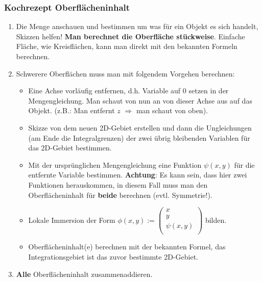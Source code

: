 \documentclass[a4paper, fontsize = 8pt, landscape]{scrartcl}
\begin{document}
\begin{multicols*}{3}
\begin{small}
        \subsubsection{Kochrezept Oberflächeninhalt}

        \begin{enumerate}
            \item Die Menge anschauen und bestimmen um was für ein Objekt es sich handelt, Skizzen helfen! \textbf{Man berechnet die Oberfläche stückweise}. Einfache Fläche, wie Kreisflächen, kann man direkt mit den bekannten Formeln berechnen.
            \item Schwerere Oberflächen muss man mit folgendem Vorgehen berechnen:
                  \begin{itemize}
                      \item Eine Achse vorläufig entfernen, d.h. Variable auf $0$ setzen in der Mengengleichung. Man schaut von nun an von dieser Achse aus auf das Objekt. (z.B.: Man entfernt $z$ $\Rightarrow$ man schaut von oben).
                      \item Skizze von dem neuen 2D-Gebiet erstellen und dann die Ungleichungen (am Ende die Integralgrenzen) der zwei übrig bleibenden Variablen für das 2D-Gebiet bestimmen.
                      \item Mit der ursprünglichen Mengengleichung eine Funktion $\psi(x,y)$ für die entfernte Variable bestimmen. \textbf{Achtung}: Es kann sein, dass hier zwei Funktionen herauskommen, in diesem Fall muss man den Oberflächeninhalt für \textbf{beide} berechnen (evtl. Symmetrie!).
                      \item Lokale Immersion der Form $\phi(x,y) := \begin{pmatrix}
                                    x \\ y \\ \psi(x,y) \\
                                \end{pmatrix}$ bilden.
                      \item Oberflächeninhalt(e) berechnen mit der bekannten Formel, das Integrationsgebiet ist das zuvor bestimmte 2D-Gebiet.
                  \end{itemize}
            \item \textbf{Alle} Oberflächeninhalt zusammenaddieren.
        \end{enumerate}

    \end{small}


\end{multicols*}
\end{document}
